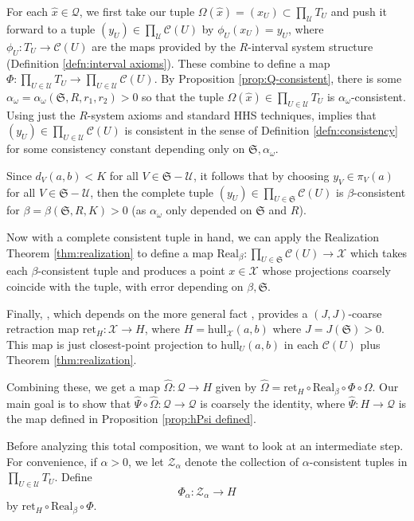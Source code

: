 \documentclass{amsart}
\theoremstyle{definition}
\theoremstyle{remark}
\theoremstyle{definition}
\newcommand{\calC}{\mathcal{C}}
\newcommand{\calQ}{\mathcal{Q}}
\newcommand{\calU}{\mathcal{U}}
\newcommand{\calX}{\mathcal{X}}
\newcommand{\calZ}{\mathcal{Z}}
\newcommand{\hx}{\hat{x}}
\newcommand{\hO}{\widehat{\Omega}}
\newcommand{\hPsi}{\widehat{\Psi}}
\newcommand{\hull}{\mathrm{hull}}
\begin{document}
For each $\hx \in \calQ$, we first take our tuple $\Omega(\hx) = (x_U) \subset \prod_{\calU} T_U$ and push it forward to a tuple $(y_U) \in \prod_{\calU} \calC(U)$ by $\phi_U(x_U) = y_U$, where $\phi_U:T_U \to \calC(U)$ are the maps provided by the $R$-interval system structure (Definition \ref{defn:interval axioms}).  These combine to define a map $\Phi:\prod_{U \in \calU} T_U \to \prod_{U \in \calU} \calC(U)$.  By Proposition \ref{prop:Q-consistent}, there is some $\alpha_{\omega} = \alpha_{\omega}(\mathfrak S, R,r_1,r_2)>0$ so that the tuple $\Omega(\hx) \in \prod_{U \in \calU}T_U$ is $\alpha_{\omega}$-consistent.  Using just the $R$-system axioms and standard HHS techniques, \cite[Proposition 6.17]{Dur_infcube} implies that $(y_U) \in \prod_{U \in \calU} \calC(U)$ is consistent in the sense of Definition \ref{defn:consistency} for some consistency constant depending only on $\mathfrak S, \alpha_{\omega}$. 

Since $d_V(a,b) < K$ for all $V \in \mathfrak S - \calU$, it follows that by choosing $y_V \in \pi_V(a)$ for all $V \in \mathfrak S - \calU$, then the complete tuple $(y_U) \in \prod_{U \in \mathfrak S} \calC(U)$ is $\beta$-consistent for $\beta = \beta(\mathfrak S, R, K)>0$ (as $\alpha_{\omega}$ only depended on $\mathfrak S$ and $R$).

Now with a complete consistent tuple in hand, we can apply the Realization Theorem \ref{thm:realization} to define a map $\mathrm{Real}_{\beta}:\prod_{U \in \mathfrak S} \calC(U) \to \calX$ which takes each $\beta$-consistent tuple and produces a point $x \in \calX$ whose projections coarsely coincide with the tuple, with error depending on $\beta, \mathfrak S$.

Finally, \cite[Lemma 6.6]{Dur_infcube}, which depends on the more general fact \cite[Proposition 6.3]{HHS_II}, provides a $(J,J)$-coarse retraction map $\mathrm{ret}_H:\calX \to H$, where $H = \hull_{\calX}(a,b)$ where $J = J(\mathfrak S)>0$.  This map is just closest-point projection to $\hull_U(a,b)$ in each $\calC(U)$ plus Theorem \ref{thm:realization}. 

Combining these, we get a map $\hO:\calQ \to H$ given by $\hO = \mathrm{ret}_H \circ \mathrm{Real}_{\beta} \circ \Phi \circ \Omega$.  Our main goal is to show that $\hPsi \circ \hO:\calQ \to \calQ$ is coarsely the identity, where $\hPsi:H \to \calQ$ is the map defined in Proposition \ref{prop:hPsi defined}.

Before analyzing this total composition, we want to look at an intermediate step.  For convenience, if $\alpha>0$, we let $\calZ_{\alpha}$ denote the collection of $\alpha$-consistent tuples in $\prod_{U \in \calU} T_U$.  Define
$$\Phi_{\alpha}:\calZ_{\alpha} \to H$$ by $\mathrm{ret}_H \circ \mathrm{Real}_{\beta} \circ \Phi$.
\end{document}
